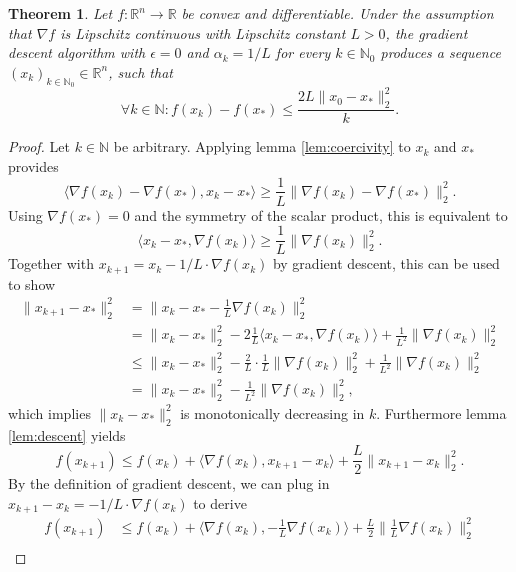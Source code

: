 \documentclass[11pt, a4paper]{article}
\newtheorem{theorem}{Theorem}[section]
\newcommand{\N}{\mathbb{N}}
\newcommand{\R}{\mathbb{R}}
\begin{document}
\begin{theorem}
Let $f: \R^n \to \R$ be convex and differentiable. Under the assumption that $\nabla f$ is Lipschitz continuous with Lipschitz constant $L>0$, the gradient descent algorithm with $\epsilon = 0$ and $\alpha_k = 1/L$ for every $k \in \N_0$ produces a sequence $(x_k)_{k \in \N_0} \in \R^n$, such that 
\[ \forall k \in \N : f(x_k) - f(x_*) \leq \frac{2L \big \| x_0 - x_* \big \|_2^2 }{k}. \]
\end{theorem}

\begin{proof}
Let $k \in \N$ be arbitrary. Applying lemma \ref{lem:coercivity} to $x_k$ and $x_*$ provides
\[ \big \langle \nabla f(x_k) - \nabla f(x_*), x_k - x_* \big \rangle \ge \frac{1}{L} \big \| \nabla f(x_k) - \nabla f(x_*) \big \|_2^2. \]
Using $\nabla f(x_*) = 0$ and the symmetry of the scalar product, this is equivalent to
\[ \big \langle x_k - x_* ,\nabla f(x_k) \big \rangle \ge \frac{1}{L} \big \| \nabla f(x_k) \big \|_2^2. \]
Together with $x_{k+1} = x_k - 1/L \cdot \nabla f(x_k)$ by gradient descent, this can be used to show
\begin{equation} \begin{split}
\big \| x_{k+1} - x_* \big \|_2^2
&= \big \| x_k - x_* - \frac{1}{L} \nabla f(x_k) \big \|_2^2 \\\
&= \big \| x_k - x_* \big \|_2^2 - 2 \frac{1}{L} \big \langle x_k - x_* , \nabla f(x_k) \big \rangle + \frac{1}{L^2} \big \| \nabla f(x_k) \big \|_2^2 \\\
&\leq \big \| x_k - x_* \big \|_2^2 - \frac{2}{L} \cdot \frac{1}{L} \big \| \nabla f(x_k) \big \|_2^2 + \frac{1}{L^2} \big \| \nabla f(x_k) \big \|_2^2 \\\
& = \big \| x_k - x_* \big \|_2^2 - \frac{1}{L^2} \big \| \nabla f(x_k) \big \|_2^2,
\end{split} \end{equation}
which implies $\big \| x_{k} - x_* \big \|_2^2$ is monotonically decreasing in $k$. Furthermore lemma \ref{lem:descent} yields
\[  f(x_{k+1}) \leq f(x_k) + \big \langle \nabla f(x_k) , x_{k+1} -x_k \big \rangle + \frac{L}{2} \big \| x_{k+1} - x_k \big \|_2^2. \]
By the definition of gradient descent, we can plug in $x_{k+1} - x_k = - 1/L \cdot \nabla f(x_k)$ to derive
\begin{equation} \begin{split} 
f(x_{k+1}) 
&\leq f(x_k) + \big \langle \nabla f(x_k) , - \frac{1}{L} \nabla f(x_k) \big \rangle + \frac{L}{2} \big \| \frac{1}{L} \nabla f(x_k) \big \|_2^2 \\\

\end{split}
\end{equation}
\end{proof}
\end{document}
